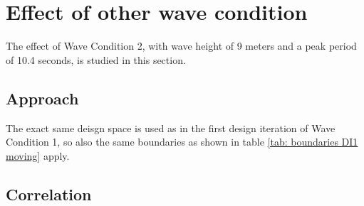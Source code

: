 


\section{Effect of other wave condition}
\label{sec: WC2 moving}

The effect of Wave Condition 2, with wave height of 9 meters and a peak period of 10.4 seconds, is studied in this section. 


\subsection{Approach}

The exact same deisgn space is used as in the first design iteration of Wave Condition 1, so also the same boundaries as shown in table \ref{tab: boundaries DI1 moving} apply.

\subsection{Correlation}
    





